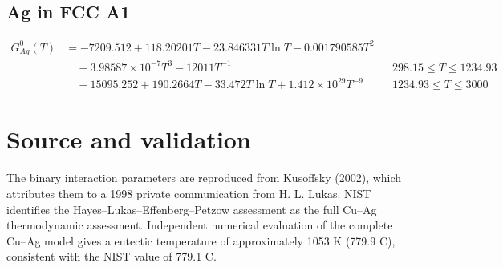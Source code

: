 \documentclass[11pt]{article}
\begin{document}
\subsection*{Ag in FCC A1}
\begin{align*}
G^0_{Ag}(T) &=  - 7209.512 + 118.20201T - 23.846331T\ln T - 0.001790585T^{2}\\[4pt]
&\quad - 3.98587\times 10^{-7}T^{3} - 12011T^{-1} && 298.15 \le T \le 1234.93\\[4pt]
&\quad - 15095.252 + 190.2664T - 33.472T\ln T + 1.412\times 10^{29}T^{-9} && 1234.93 \le T \le 3000
\end{align*}

\section*{Source and validation}
The binary interaction parameters are reproduced from Kusoffsky (2002), which attributes them to a 1998 private communication from H. L. Lukas. NIST identifies the Hayes--Lukas--Effenberg--Petzow assessment as the full Cu--Ag thermodynamic assessment. Independent numerical evaluation of the complete Cu--Ag model gives a eutectic temperature of approximately 1053 K (779.9 C), consistent with the NIST value of 779.1 C.
\end{document}
